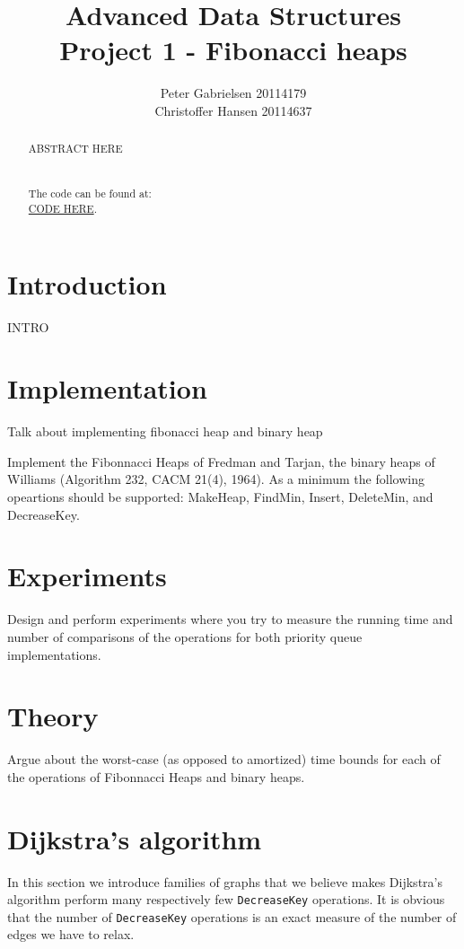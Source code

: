 \documentclass[a4paper,oneside,article,11pt]{memoir}
\title{Advanced Data Structures \\ Project 1 - Fibonacci heaps}
\author{Peter Gabrielsen 20114179 \\
Christoffer Hansen 20114637}
\begin{document}
\begin{titlingpage}
\clearpage

\maketitle
\thispagestyle{empty}

\begin{abstract}
ABSTRACT HERE
\\
\\
\\
The code can be found at: \\\url{CODE HERE}.
\end{abstract}
\end{titlingpage}

\pagebreak

\tableofcontents

\pagebreak

\chapter{Introduction}
INTRO

\chapter{Implementation}
Talk about implementing fibonacci heap and binary heap

Implement
the Fibonnacci Heaps of Fredman and Tarjan,
the binary heaps of Williams (Algorithm 232, CACM 21(4), 1964).
As a minimum the following opeartions should be supported: MakeHeap, FindMin, Insert, DeleteMin, and DecreaseKey.

\chapter{Experiments}
Design and perform experiments where you try to measure the running time and number of comparisons of the operations for both priority queue implementations.


\chapter{Theory}
Argue about the worst-case (as opposed to amortized) time bounds for each of the operations of Fibonnacci Heaps and binary heaps.

\chapter{Dijkstra's algorithm}
In this section we introduce families of graphs that we believe makes Dijkstra's algorithm perform many respectively few \texttt{DecreaseKey} operations. It is obvious that the number of \texttt{DecreaseKey} operations is an exact measure of the number of edges we have to relax.
\end{document}
